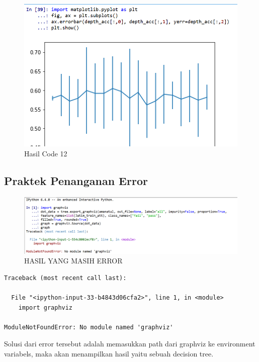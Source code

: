 \begin{enumerate}
\begin{itemize}
\begin{figure}[ht]
\centering
\includegraphics[scale=0.4]{figures/andi/gg12.PNG}
\caption{Hasil Code 12}
\label{contoh}
\end{figure}

\end{itemize}
\end{enumerate}
\subsection{Praktek Penanganan Error}

\begin{figure}[ht]
\centering
\includegraphics[scale=0.4]{figures/andi/eror1.PNG}
\caption{HASIL YANG MASIH ERROR}
\label{contoh}
\end{figure}

\begin{verbatim}
Traceback (most recent call last):

  File "<ipython-input-33-b4843d06cfa2>", line 1, in <module>
    import graphviz

ModuleNotFoundError: No module named 'graphviz'
\end{verbatim}

Solusi dari error tersebut adalah memasukkan path dari graphviz ke environment variabels, maka akan menampilkan hasil yaitu sebuah decision tree.











